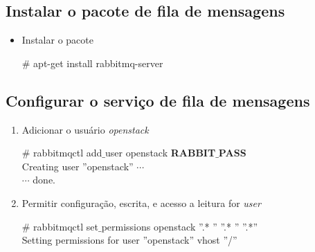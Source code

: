 \documentclass[a4paper]{book}
\begin{document}
			\subsection{Instalar o pacote de fila de mensagens}
			\begin{itemize}
				\item Instalar o pacote
				\begin{snugshade}
					\# apt-get install rabbitmq-server
				\end{snugshade}
			\end{itemize}
		
			\subsection{Configurar o serviço de fila de mensagens}
			\begin{enumerate}
				\item Adicionar o usuário \emph{openstack}
				\begin{snugshade}
					\# rabbitmqctl add$\_$user openstack \textbf{RABBIT$\_$\textbf{PASS}} \\
					Creating user ''openstack'' $\cdots$	\\
					$\cdots$ done.
				\end{snugshade}
				
				\item Permitir configuração, escrita, e acesso a leitura  for \emph{user}
				\begin{snugshade}
					\# rabbitmqctl set$\_$permissions openstack ''.* '' ''.* '' ''.*'' \\
					Setting permissions for user ''openstack'' vhost ''/''
				\end{snugshade}
			\end{enumerate}
			
			
			
							
						
							
\end{document}
